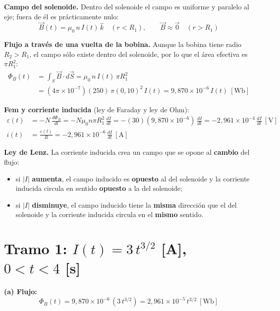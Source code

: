 \documentclass[12pt,letterpaper]{article}
\newcommand{\eps}{\varepsilon}
\begin{document}
\noindent\textbf{Campo del solenoide.} Dentro del solenoide el campo es uniforme y paralelo al eje;
fuera de \'el es pr\'acticamente nulo:
\[
    \vec{B}(t) = \mu_0\,n\,I(t)\,\hat{k}\quad (r < R_1),\qquad \vec{B}\approx\vec{0}\quad (r > R_1)
\]

\noindent\textbf{Flujo a trav\'es de una vuelta de la bobina.} Aunque la bobina tiene radio
$R_2 > R_1$, el campo s\'olo existe dentro del solenoide, por lo que el \'area efectiva es
$\pi R_1^2$:
\begin{align*}
    \Phi_B(t) &= \int_S\vec{B}\cdot d\vec{S} = \mu_0\,n\,I(t)\,\pi R_1^2\\[3pt]
              &= (4\pi\times10^{-7})(250)\,\pi(0{,}10)^2\,I(t)
               = 9{,}870\times10^{-6}\,I(t)\ [\text{Wb}]
\end{align*}

\noindent\textbf{Fem y corriente inducida} (ley de Faraday y ley de Ohm):
\begin{align*}
    \eps(t) &= -N\,\frac{d\Phi_B}{dt} = -N\mu_0 n\pi R_1^2\,\frac{dI}{dt}
             = -(30)(9{,}870\times10^{-6})\,\frac{dI}{dt}
             = -2{,}961\times10^{-4}\,\frac{dI}{dt}\ [\text{V}]\\[3pt]
    i(t) &= \frac{\eps(t)}{R} = -2{,}961\times10^{-6}\,\frac{dI}{dt}\ [\text{A}]
\end{align*}

\noindent\textbf{Ley de Lenz.} La corriente inducida crea un campo que se opone al
\textbf{cambio} del flujo:
\begin{itemize}\setlength\itemsep{2pt}
    \item si $|I|$ \textbf{aumenta}, el campo inducido es \textbf{opuesto} al del solenoide y la corriente
          inducida circula en sentido \textbf{opuesto} a la del solenoide;
    \item si $|I|$ \textbf{disminuye}, el campo inducido tiene la \textbf{misma} direcci\'on que el del
          solenoide y la corriente inducida circula en el \textbf{mismo} sentido.
\end{itemize}

\section*{Tramo 1: $I(t) = 3\,t^{3/2}$ [A], \ $0 < t < 4$ [s]}

\noindent\textbf{(a) Flujo:}
\[
    \boxed{\Phi_B(t) = 9{,}870\times10^{-6}\,(3\,t^{3/2}) = 2{,}961\times10^{-5}\,t^{3/2}\ [\text{Wb}]}
\]
\end{document}
